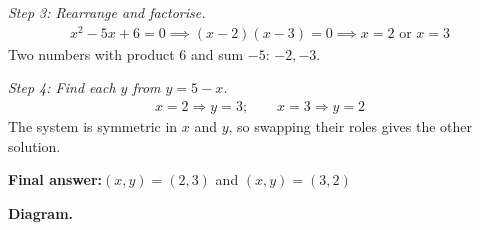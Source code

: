 \documentclass[11pt]{article}
\begin{document}
\textit{Step 3: Rearrange and factorise.}
\[\begin{gathered}
x^2 - 5x + 6 = 0 \implies (x - 2)(x - 3) = 0 \implies x = 2 \text{ or } x = 3
\end{gathered}\]
Two numbers with product 6 and sum \( -5 \): \( -2, -3 \).

\textit{Step 4: Find each \( y \) from \( y = 5 - x \).}
\[\begin{gathered}
x = 2 \Rightarrow y = 3; \qquad x = 3 \Rightarrow y = 2
\end{gathered}\]
The system is symmetric in \( x \) and \( y \), so swapping their roles gives the other solution.

\begin{answerbox}
\textbf{Final answer:}\quad \(\displaystyle (x, y) = (2, 3)\) and \(\displaystyle (x, y) = (3, 2)\)
\end{answerbox}
\textbf{Diagram.}
\end{document}
